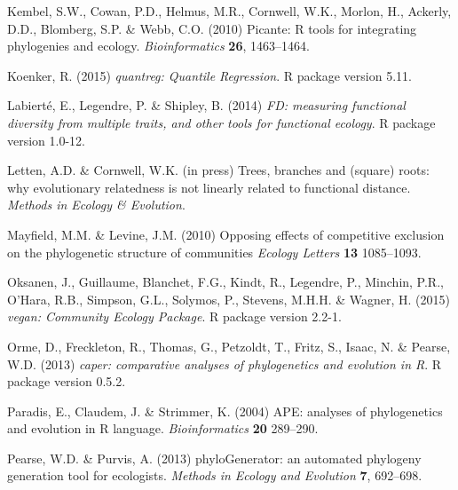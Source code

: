 \documentclass{bioinfo}
\begin{document}
\begin{thebibliography}{30}
Kembel, S.W., Cowan, P.D., Helmus, M.R., Cornwell, W.K., Morlon, H., Ackerly,
  D.D., Blomberg, S.P. \& Webb, C.O. (2010) Picante: R tools for integrating
  phylogenies and ecology. \emph{Bioinformatics} \textbf{26}, 1463--1464.

 Koenker, R. (2015)
  \emph{quantreg: Quantile
    Regression}. R package version 5.11.

 Labiert\'{e}, E., Legendre,
  P. \& Shipley, B. (2014) \emph{FD: measuring functional diversity
    from multiple traits, and other tools for functional
    ecology}. R package version 1.0-12.

 Letten, A.D. \&
  Cornwell, W.K. (in press) Trees, branches and (square) roots: why
  evolutionary relatedness is not linearly related to functional
  distance. \emph{Methods in Ecology \& Evolution}.

  Mayfield, M.M. \& Levine, J.M. (2010) Opposing effects of
  competitive exclusion on the phylogenetic structure of communities
  \emph{Ecology Letters} \textbf{13} 1085--1093.

 Oksanen, J., Guillaume, Blanchet, F.G., Kindt,
R., Legendre, P., Minchin, P.R., O'Hara, R.B., Simpson, G.L., Solymos,
P., Stevens, M.H.H. \& Wagner, H. (2015) \emph{vegan: Community Ecology
  Package}. R package version 2.2-1.

Orme, D., Freckleton, R., Thomas, G., Petzoldt, T., Fritz, S., Isaac, N. \&
  Pearse, W.D. (2013) \emph{caper: comparative analyses of phylogenetics and
  evolution in {R}}. R package version 0.5.2.

 Paradis, E., Claudem, J. \& Strimmer, K.
  (2004) APE: analyses of phylogenetics and evolution in R
  language. \emph{Bioinformatics} \textbf{20} 289--290.

 Pearse, W.D. \& Purvis,
  A. (2013) phyloGenerator: an automated phylogeny generation tool for
  ecologists. \emph{Methods in Ecology and Evolution} \textbf{7},
  692--698.


\end{thebibliography}
\end{document}
